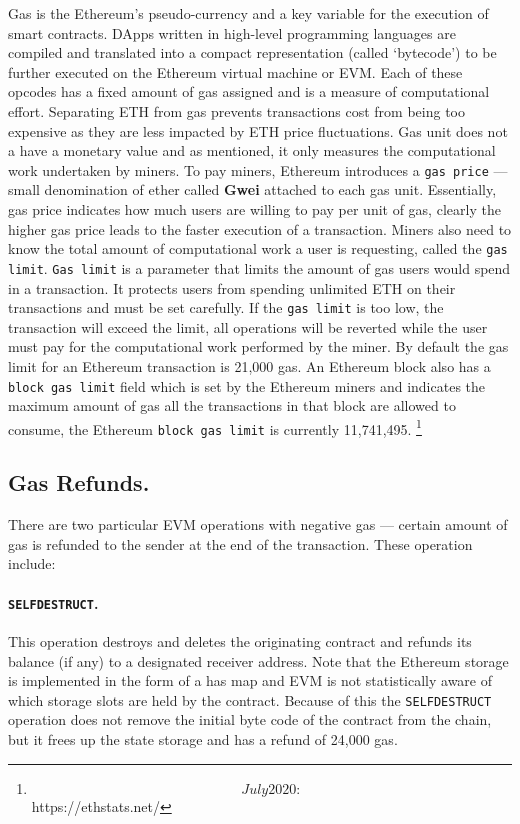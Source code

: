 \begin{itemize}
Gas is the Ethereum's pseudo-currency and a key variable for the execution of smart contracts. DApps written in high-level programming languages are compiled and translated into a compact representation (called ‘bytecode’) to be further executed on the Ethereum virtual machine or EVM. Each of these opcodes has a fixed amount of gas assigned and is a measure of computational effort. Separating ETH from gas prevents transactions cost from being too expensive as they are less impacted by ETH price fluctuations. Gas unit does not a have a monetary value and as mentioned, it only  measures the computational work undertaken by miners. To pay miners, Ethereum introduces a \texttt{gas price} --- small denomination of ether called \textbf{Gwei} attached to each gas unit. Essentially, gas price indicates how much users are willing to pay per unit of gas, clearly the higher gas price leads to the faster execution of a transaction. Miners also need to know the total amount of computational work a user is requesting, called the \texttt{gas limit}. \texttt{Gas limit} is a parameter that limits the amount of gas users would spend in a transaction. It protects users from spending unlimited ETH on their transactions and must be set carefully. If the \texttt{gas limit} is too low, the transaction will exceed the limit, all operations will be reverted while the user must pay for the computational work performed by the miner. By default the gas limit for an Ethereum transaction is 21,000 gas. An Ethereum block also has a \texttt{block gas limit} field which is set by the Ethereum miners and indicates the maximum amount of gas all the transactions in that block are allowed to consume, the Ethereum \texttt{block gas limit} is currently 11,741,495. \footnote{\[July 2020:\] https://ethstats.net/} 


\subsection*{Gas Refunds.}There are two particular EVM operations with negative gas --- certain amount of gas is refunded to the sender at the end of the transaction. These operation include:

\paragraph{\texttt{SELFDESTRUCT}.}This operation destroys and deletes the originating contract and refunds its balance (if any) to a designated receiver address. Note that the Ethereum storage is implemented in the form of a has map and EVM is not statistically aware of which storage slots are held by the contract. Because of this the \texttt{SELFDESTRUCT} operation does not remove the initial byte code of the contract from the chain, but it frees up the state storage and has a refund of 24,000 gas.


\end{itemize}
